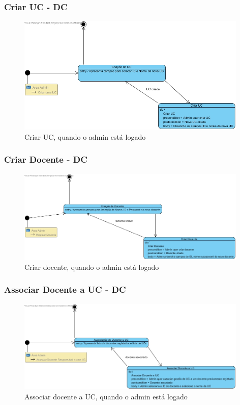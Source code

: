 \documentclass[a4paper]{article}
\begin{document}
\subsubsection{Criar UC - DC}
\begin{figure}[H]
\centering
\includegraphics[width=11cm]{MECriarUC}
\caption{Criar UC, quando o admin está logado}
\label{}
\end{figure}

\subsubsection{Criar Docente - DC}
\begin{figure}[H]
\centering
\includegraphics[width=11cm]{MECriarDocente}
\caption{Criar docente, quando o admin está logado}
\label{}
\end{figure}

\subsubsection{Associar Docente a UC - DC}
\begin{figure}[H]
\centering
\includegraphics[width=11cm]{MEAssociarDocenteaUC}
\caption{Associar docente a UC, quando o admin está logado}
\label{}
\end{figure}
\end{document}
